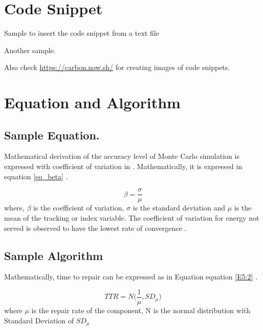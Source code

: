 \section{Code Snippet}
Sample to insert the code snippet from a text file

\begin{adjustbox}{width=\textwidth}

\end{adjustbox}

Another sample. 

\begin{adjustbox}{width=\textwidth}

\end{adjustbox}

Also check \url{https://carbon.now.sh/} for creating images of code snippets.


\section{Equation and Algorithm}

\subsection{Sample Equation.}
Mathematical derivation of the accuracy level of Monte Carlo simulation is expressed with coefficient of variation in \cite{li1994reliability}. Mathematically, it is expressed in equation \ref{eq_beta}  \cite{li1994reliability}.

\begin{equation}\label{eq_beta}
    \beta = \frac{\sigma}{\mu}
\end{equation}
where, $\beta$ is the coefficient of variation, $\sigma$ is the standard deviation and $\mu$ is the mean of the tracking or index variable. The coefficient of variation for energy not served is observed to have the lowest rate of convergence \cite{li1994reliability}. 





\subsection{Sample Algorithm}
Mathematically, time to repair can be expressed as in Equation equation \ref{E5:2} \cite{clements_systemic_2018}.

\begin{equation} \label{E5:2}
    TTR =  N\Big(\frac{1}{\mu}, SD_\mu\Big)
\end{equation}
where $\mu$ is the repair rate of the component, N is the normal distribution with Standard Deviation of $SD_\mu$

